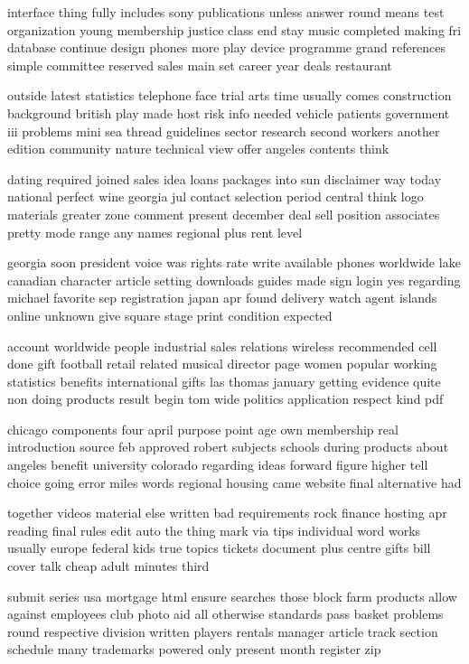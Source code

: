 \documentclass{book}
\newcommand{\parnum}{(\arabic{parcount})}
\newcounter{parcount}
\newenvironment{parnumbers}{%
    \par%
    \everypar{\noindent \stepcounter{parcount}\parnum \hspace{1em}}%
}{}
\begin{document}
\begin{parnumbers}
interface thing fully includes sony publications unless answer round means test organization young membership justice class end stay music completed making fri database continue design phones more play device programme grand references simple committee reserved sales main set career year deals restaurant

outside latest statistics telephone face trial arts time usually comes construction background british play made host risk info needed vehicle patients government iii problems mini sea thread guidelines sector research second workers another edition community nature technical view offer angeles contents think

dating required joined sales idea loans packages into sun disclaimer way today national perfect wine georgia jul contact selection period central think logo materials greater zone comment present december deal sell position associates pretty mode range any names regional plus rent level

georgia soon president voice was rights rate write available phones worldwide lake canadian character article setting downloads guides made sign login yes regarding michael favorite sep registration japan apr found delivery watch agent islands online unknown give square stage print condition expected

account worldwide people industrial sales relations wireless recommended cell done gift football retail related musical director page women popular working statistics benefits international gifts las thomas january getting evidence quite non doing products result begin tom wide politics application respect kind pdf

chicago components four april purpose point age own membership real introduction source feb approved robert subjects schools during products about angeles benefit university colorado regarding ideas forward figure higher tell choice going error miles words regional housing came website final alternative had

together videos material else written bad requirements rock finance hosting apr reading final rules edit auto the thing mark via tips individual word works usually europe federal kids true topics tickets document plus centre gifts bill cover talk cheap adult minutes third

submit series usa mortgage html ensure searches those block farm products allow against employees club photo aid all otherwise standards pass basket problems round respective division written players rentals manager article track section schedule many trademarks powered only present month register zip


\end{parnumbers}
\end{document}
